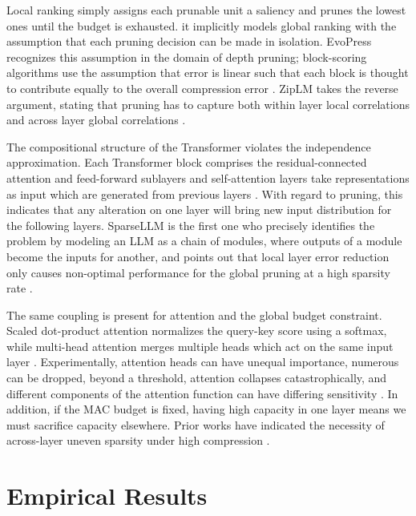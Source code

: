 Local ranking simply assigns each prunable unit a saliency and prunes the lowest ones until the budget is exhausted. it implicitly models global ranking with the assumption that each pruning decision can be made in isolation. EvoPress recognizes this assumption in the domain of depth pruning; block-scoring algorithms use the assumption that error is linear such that each block is thought to contribute equally to the overall compression error \cite{evopress2024}. ZipLM takes the reverse argument, stating that pruning has to capture both within layer local correlations and across layer global correlations \cite{kurtic2023ziplm}.

The compositional structure of the Transformer violates the independence approximation. Each Transformer block comprises the residual-connected attention and feed-forward sublayers and self-attention layers take representations as input which are generated from previous layers \cite{vaswani2017attention}. With regard to pruning, this indicates that any alteration on one layer will bring new input distribution for the following layers. SparseLLM is the first one who precisely identifies the problem by modeling an LLM as a chain of modules, where outputs of a module become the inputs for another, and points out that local layer error reduction only causes non-optimal performance for the global pruning at a high sparsity rate \cite{bai2024sparsellm}.

The same coupling is present for attention and the global budget constraint. Scaled dot-product attention normalizes the query-key score using a softmax, while multi-head attention merges multiple heads which act on the same input layer \cite{vaswani2017attention}. Experimentally, attention heads can have unequal importance, numerous can be dropped, beyond a threshold, attention collapses catastrophically, and different components of the attention function can have differing sensitivity \cite{michel2022not}. In addition, if the MAC budget is fixed, having high capacity in one layer means we must sacrifice capacity elsewhere. Prior works have indicated the necessity of across-layer uneven sparsity under high compression \cite{gale2019state,sanh2020movement,li2024dsa}.

\section{Empirical Results}
\label{sec:empirical}

